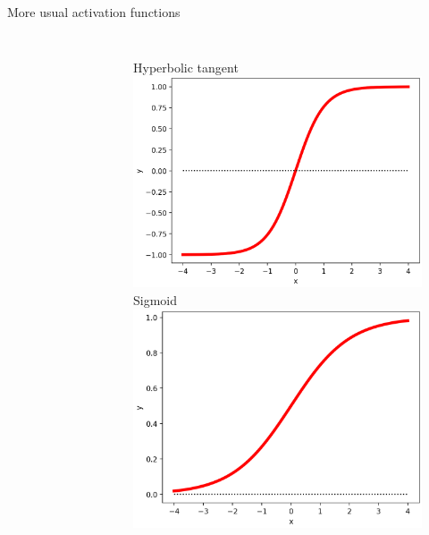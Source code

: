 \documentclass[handout, 10pt]{beamer}
\begin{document}
\begin{frame}{More usual activation functions}
\begin{columns}
\begin{figure}
    \end{figure}
    \begin{figure}
     \centering
        Hyperbolic tangent\\
        \includegraphics[width=.85\textwidth]{fig/L2/activ-tanh.png}\\
       Sigmoid\\
        \includegraphics[width=.85\textwidth]{fig/L2/activ-sigmoid.png}\\

    \end{figure}
\end{columns}
\end{frame}
\end{document}
